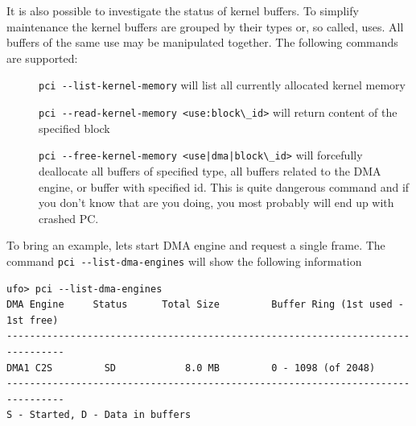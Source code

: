 It is also possible to investigate the status of kernel buffers. To simplify maintenance the kernel buffers are grouped by their types or, so called, uses. All buffers of the same use may be manipulated together. The following commands are supported:
\begin{description}
\item[ ] \verb/pci --list-kernel-memory/ will list all currently allocated kernel memory
\item[ ] \verb/pci --read-kernel-memory <use:block\_id>/ will return content of the specified block
\item[ ] \verb/pci --free-kernel-memory <use|dma|block\_id>/ will forcefully deallocate all buffers of specified type, all buffers related to the DMA engine, or buffer with specified id. This is quite dangerous command and if you don't know that are you doing, you most probably will end up with crashed PC.
\end{description}

To bring an example, lets start DMA engine and request a single frame. The command \verb/pci --list-dma-engines/ will show the following information

\begin{verbatim}
ufo> pci --list-dma-engines
DMA Engine     Status      Total Size         Buffer Ring (1st used - 1st free)
--------------------------------------------------------------------------------
DMA1 C2S         SD            8.0 MB         0 - 1098 (of 2048)
--------------------------------------------------------------------------------
S - Started, D - Data in buffers
\end{verbatim}

